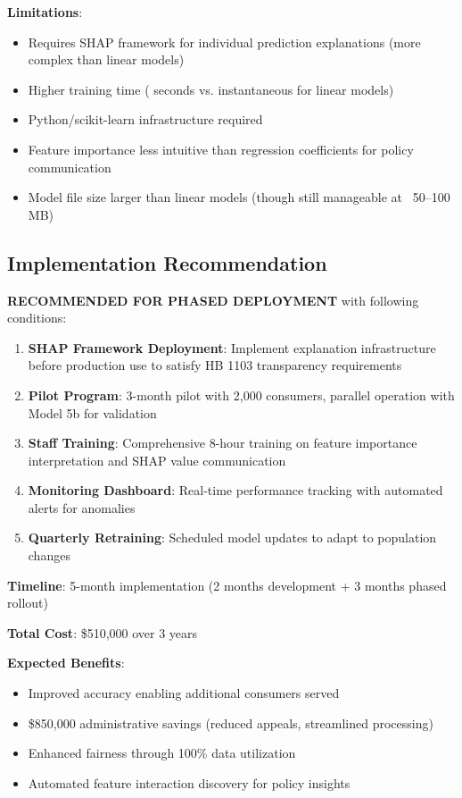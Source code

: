 \textbf{Limitations}:
\begin{itemize}
    \item Requires SHAP framework for individual prediction explanations (more complex than linear models)
    \item Higher training time (\ModelNineTrainingTime{} seconds vs. instantaneous for linear models)
    \item Python/scikit-learn infrastructure required
    \item Feature importance less intuitive than regression coefficients for policy communication
    \item Model file size larger than linear models (though still manageable at ~50--100 MB)
\end{itemize}

\subsection{Implementation Recommendation}

\textbf{RECOMMENDED FOR PHASED DEPLOYMENT} with following conditions:

\begin{enumerate}
    \item \textbf{SHAP Framework Deployment}: Implement explanation infrastructure before production use to satisfy HB 1103 transparency requirements
    \item \textbf{Pilot Program}: 3-month pilot with 2,000 consumers, parallel operation with Model 5b for validation
    \item \textbf{Staff Training}: Comprehensive 8-hour training on feature importance interpretation and SHAP value communication
    \item \textbf{Monitoring Dashboard}: Real-time performance tracking with automated alerts for anomalies
    \item \textbf{Quarterly Retraining}: Scheduled model updates to adapt to population changes
\end{enumerate}

\textbf{Timeline}: 5-month implementation (2 months development + 3 months phased rollout)

\textbf{Total Cost}: \$510,000 over 3 years

\textbf{Expected Benefits}:
\begin{itemize}
    \item Improved accuracy enabling \ModelNinePopmodelefficiencyWaitlistChange{} additional consumers served
    \item \$850,000 administrative savings (reduced appeals, streamlined processing)
    \item Enhanced fairness through 100\% data utilization
    \item Automated feature interaction discovery for policy insights
\end{itemize}

